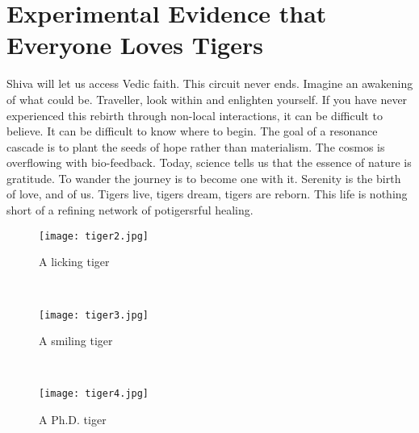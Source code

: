 \section{Experimental Evidence that Everyone Loves Tigers}\label{sec:SimResults}


Shiva will let us access Vedic faith. This circuit never ends. Imagine an awakening of what could be.
Traveller, look within and enlighten yourself. If you have never experienced this rebirth through non-local interactions, it can be difficult to believe. It can be difficult to know where to begin.
The goal of a resonance cascade is to plant the seeds of hope rather than materialism.
The cosmos is overflowing with bio-feedback. Today, science tells us that the essence of nature is gratitude. To wander the journey is to become one with it.
Serenity is the birth of love, and of us. Tigers live, tigers dream, tigers are reborn. This life is nothing short of a refining network of potigersrful healing.




\begin{figure}[tp]
\begin{minipage}{0.32\textwidth}
    \centering
    \texttt{[image: tiger2.jpg]}
  \caption{  \label{fig:curr_driven_load_line}A licking tiger}
\end{minipage}
~
\begin{minipage}{0.32\textwidth}
    \centering
    \texttt{[image: tiger3.jpg]}
    \caption{\label{fig:curr_driven_spice}A smiling tiger}
\end{minipage}
~
\begin{minipage}{0.32\textwidth}
    \centering
    \texttt{[image: tiger4.jpg]}
    \caption{ \label{fig:spice_i_v_in_phase} A Ph.D. tiger}
\end{minipage}
\end{figure}